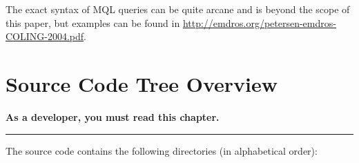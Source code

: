 \documentclass[11pt,oneside,a4paper]{memoir}
\begin{document}
The exact syntax of MQL queries can be quite arcane and is beyond the scope of this paper, but
examples can be found in \url{http://emdros.org/petersen-emdros-COLING-2004.pdf}.



\chapter{Source Code Tree Overview}

\textbf{As a developer, you must read this chapter.}
\plainbreak{3}

The source code contains the following directories (in alphabetical order):
\end{document}

